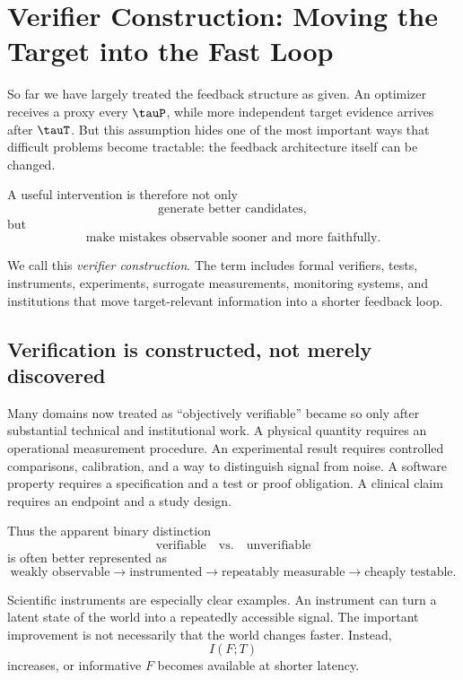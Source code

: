 \section{Verifier Construction: Moving the Target into the Fast Loop}
\label{sec:verifier-construction}

So far we have largely treated the feedback structure as given.  An optimizer receives
a proxy every \(\tauP\), while more independent target evidence arrives after
\(\tauT\).  But this assumption hides one of the most important ways that difficult
problems become tractable: the feedback architecture itself can be changed.

A useful intervention is therefore not only
\[
    \text{generate better candidates},
\]
but
\[
    \boxed{\text{make mistakes observable sooner and more faithfully}.}
\]

We call this \emph{verifier construction}.  The term includes formal verifiers, tests,
instruments, experiments, surrogate measurements, monitoring systems, and
institutions that move target-relevant information into a shorter feedback loop.

\subsection{Verification is constructed, not merely discovered}

Many domains now treated as ``objectively verifiable'' became so only after substantial
technical and institutional work.  A physical quantity requires an operational
measurement procedure.  An experimental result requires controlled comparisons,
calibration, and a way to distinguish signal from noise.  A software property requires
a specification and a test or proof obligation.  A clinical claim requires an endpoint
and a study design.

Thus the apparent binary distinction
\[
    \text{verifiable} \quad\text{vs.}\quad \text{unverifiable}
\]
is often better represented as
\[
    \text{weakly observable}
    \rightarrow
    \text{instrumented}
    \rightarrow
    \text{repeatably measurable}
    \rightarrow
    \text{cheaply testable}.
\]

Scientific instruments are especially clear examples.  An instrument can turn a
latent state of the world into a repeatedly accessible signal.  The important
improvement is not necessarily that the world changes faster.  Instead,
\[
    I(F;T)
\]
increases, or informative \(F\) becomes available at shorter latency.

